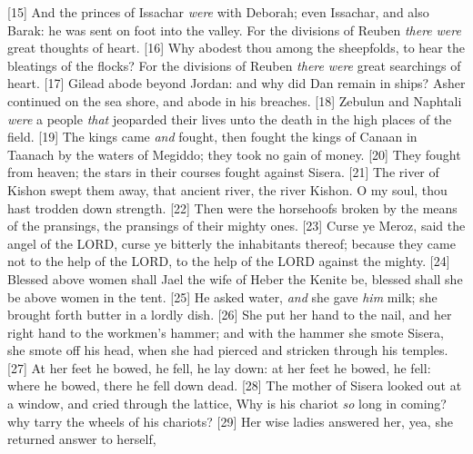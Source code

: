 [15] \textcolor[cmyk]{0.99998,1,0,0}{And the princes of Issachar \emph{were} with Deborah; even Issachar, and also Barak: he was sent on foot into the valley. For the divisions of Reuben \emph{there} \emph{were} great thoughts of heart.}
[16] \textcolor[cmyk]{0.99998,1,0,0}{Why abodest thou among the sheepfolds, to hear the bleatings of the flocks? For the divisions of Reuben \emph{there} \emph{were} great searchings of heart.}
[17] \textcolor[cmyk]{0.99998,1,0,0}{Gilead abode beyond Jordan: and why did Dan remain in ships? Asher continued on the sea shore, and abode in his breaches.}
[18] \textcolor[cmyk]{0.99998,1,0,0}{Zebulun and Naphtali \emph{were} a people \emph{that} jeoparded their lives unto the death in the high places of the field.}
[19] \textcolor[cmyk]{0.99998,1,0,0}{The kings came \emph{and} fought, then fought the kings of Canaan in Taanach by the waters of Megiddo; they took no gain of money.}
[20] \textcolor[cmyk]{0.99998,1,0,0}{They fought from heaven; the stars in their courses fought against Sisera.}
[21] \textcolor[cmyk]{0.99998,1,0,0}{The river of Kishon swept them away, that ancient river, the river Kishon. O my soul, thou hast trodden down strength.}
[22] \textcolor[cmyk]{0.99998,1,0,0}{Then were the horsehoofs broken by the means of the pransings, the pransings of their mighty ones.}
[23] \textcolor[cmyk]{0.99998,1,0,0}{Curse ye Meroz, said the angel of the LORD, curse ye bitterly the inhabitants thereof; because they came not to the help of the LORD, to the help of the LORD against the mighty.}
[24] \textcolor[cmyk]{0.99998,1,0,0}{Blessed above women shall Jael the wife of Heber the Kenite be, blessed shall she be above women in the tent.}
[25] \textcolor[cmyk]{0.99998,1,0,0}{He asked water, \emph{and} she gave \emph{him} milk; she brought forth butter in a lordly dish.}
[26] \textcolor[cmyk]{0.99998,1,0,0}{She put her hand to the nail, and her right hand to the workmen's hammer; and with the hammer she smote Sisera, she smote off his head, when she had pierced and stricken through his temples.}
[27] \textcolor[cmyk]{0.99998,1,0,0}{At her feet he bowed, he fell, he lay down: at her feet he bowed, he fell: where he bowed, there he fell down dead.}
[28] \textcolor[cmyk]{0.99998,1,0,0}{The mother of Sisera looked out at a window, and cried through the lattice, Why is his chariot \emph{so} long in coming? why tarry the wheels of his chariots?}
[29] \textcolor[cmyk]{0.99998,1,0,0}{Her wise ladies answered her, yea, she returned answer to herself,}
